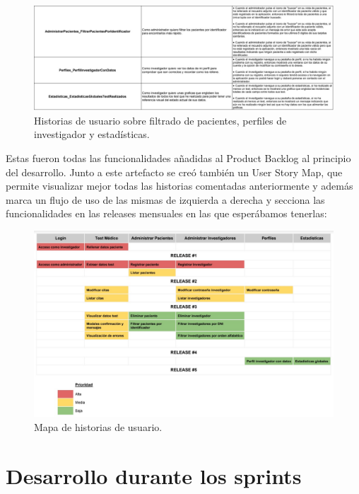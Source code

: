  \begin{figure}[h]
    \centering
     \includegraphics[width=1\textwidth]{images/historiasUsuario-5.jpg}
    \caption{Historias de usuario sobre filtrado de pacientes, perfiles de investigador y estadísticas.}
\end{figure}

Estas fueron todas las funcionalidades añadidas al Product Backlog al principio del desarrollo. Junto a este artefacto se creó también un User Story Map, que permite visualizar mejor todas las historias comentadas anteriormente y además marca un flujo de uso de las mismas de izquierda a derecha y secciona las funcionalidades en las releases mensuales en las que esperábamos tenerlas:
\newline

 \begin{figure}[h]
    \centering
     \includegraphics[width=1\textwidth]{images/userStoryMap.jpg}
    \caption{Mapa de historias de usuario.}
\end{figure}
\newpage

\section{Desarrollo durante los sprints}


